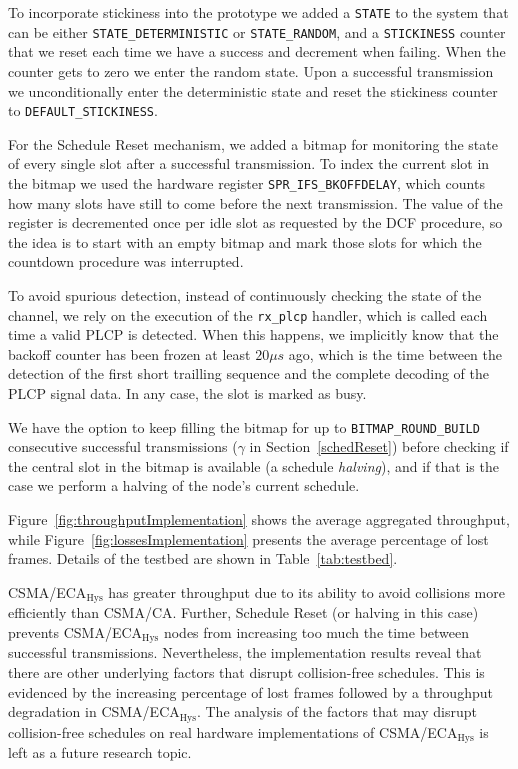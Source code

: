 To incorporate stickiness into the prototype we added a {\tt STATE} to the system that can be either {\tt STATE\_DETERMINISTIC} or {\tt STATE\_RANDOM}, and a {\tt STICKINESS} counter that we reset each time we have a success and decrement when failing. When the counter gets to zero we enter the random state. Upon a successful transmission we unconditionally enter the deterministic state and reset the stickiness counter to {\tt DEFAULT\_STICKINESS}.

For the Schedule Reset mechanism, we added a bitmap for monitoring the state of every single slot after a successful transmission. To index the current slot in the bitmap we used the hardware register {\tt SPR\_IFS\_BKOFFDELAY}, which counts how many slots have still to come before the next transmission. The value of the register is decremented once per idle slot as requested by the DCF procedure, so the idea is to start with an empty bitmap and mark those slots for which the countdown procedure was interrupted. 

To avoid spurious detection, instead of continuously checking the state of the channel, we rely on the execution of the {\tt rx\_plcp} handler, which is called each time a valid PLCP is detected. When this happens, we implicitly know that the backoff counter has been frozen at least $20\mu s$ ago, which is the time between the detection of the first short trailling sequence and the complete decoding of the PLCP signal data. In any case, the slot is marked as busy.

We have the option to keep filling the bitmap for up to {\tt BITMAP\_ROUND\_BUILD} consecutive successful transmissions ($\gamma$ in Section~\ref{schedReset}) before checking if the central slot in the bitmap is available (a schedule \emph{halving}), and if that is the case we perform a halving of the node's current schedule.

Figure~\ref{fig:throughputImplementation} shows the average aggregated throughput, while Figure~\ref{fig:lossesImplementation} presents the average percentage of lost frames. Details of the testbed are shown in Table~\ref{tab:testbed}.

CSMA/ECA$_{\text{Hys}}$ has greater throughput due to its ability to avoid collisions more efficiently than CSMA/CA. Further, Schedule Reset (or halving in this case) prevents CSMA/ECA$_{\text{Hys}}$ nodes from increasing too much the time between successful transmissions. Nevertheless, the implementation results reveal that there are other underlying factors that disrupt collision-free schedules. This is evidenced by the increasing percentage of lost frames followed by a throughput degradation in CSMA/ECA$_{\text{Hys}}$. The analysis of the factors that may disrupt collision-free schedules on real hardware implementations of CSMA/ECA$_{\text{Hys}}$ is left as a future research topic.


